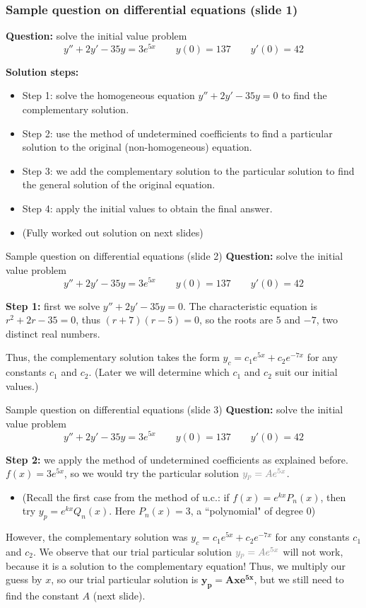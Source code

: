 \begin{frame}
\frametitle{Sample question on differential equations (slide 1)}
\textbf{Question:} solve the initial value problem \[y''+2y'-35y=3e^{5x}\qquad y(0)=137\qquad y'(0)=42\]

\textbf{Solution steps:}
\begin{itemize}
    \item\pause Step 1: solve the homogeneous equation $y''+2y'-35y=0$ to find the complementary solution.
    \item\pause Step 2: use the method of undetermined coefficients to find a particular solution to the original (non-homogeneous) equation.
    \item\pause Step 3: we add the complementary solution to the particular solution to find the general solution of the original equation.
    \item\pause Step 4: apply the initial values to obtain the final answer.
    \item\pause (Fully worked out solution on next slides)
\end{itemize}
\end{frame}

\begin{frame}{Sample question on differential equations (slide 2)}
    \textbf{Question:} solve the initial value problem \[y''+2y'-35y=3e^{5x}\qquad y(0)=137\qquad y'(0)=42\]
    
    \textbf{Step 1:} first we solve $y''+2y'-35y=0$. \pause The characteristic equation is $r^2+2r-35=0$, thus $(r+7)(r-5)=0$, so the roots are $5$ and $-7$, two distinct real numbers.\pause

    Thus, the complementary solution takes the form $y_c = c_1e^{5x} + c_2e^{-7x}$ for any constants $c_1$ and $c_2$. (Later we will determine which $c_1$ and $c_2$ suit our initial values.)
\end{frame}

\begin{frame}{Sample question on differential equations (slide 3)}
    \textbf{Question:} solve the initial value problem \[y''+2y'-35y=3e^{5x}\qquad y(0)=137\qquad y'(0)=42\]
    
    \textbf{Step 2:} we apply the method of undetermined coefficients as explained before. $f(x)=3e^{5x}$, so we would try the particular solution $\textcolor{gray}{y_p=Ae^{5x}}$.
    \begin{itemize}
    \item{\scriptsize(Recall the first case from the method of u.c.: if $f(x)=e^{kx}P_n(x)$, then try $y_p=e^{kx}Q_n(x)$. Here $P_n(x)=3$, a ``polynomial" of degree 0)}
    \end{itemize}\pause
    However, the complementary solution was $y_c = c_1e^{5x} + c_2e^{-7x}$ for any constants $c_1$ and $c_2$. We observe that our trial particular solution $\textcolor{gray}{y_p=Ae^{5x}}$ will not work, because it is a solution to the complementary equation! Thus, we multiply our guess by $x$, so our trial particular solution is $\pmb{y_p=Axe^{5x}}$, but we still need to find the constant $A$ (next slide).

\end{frame}

